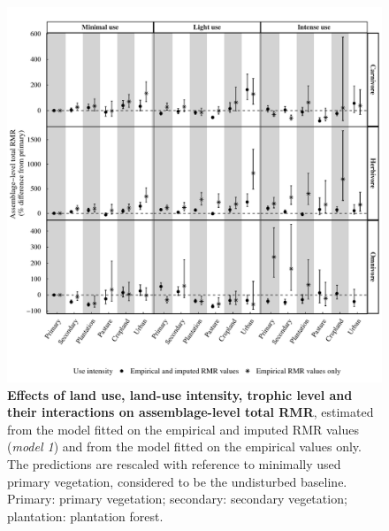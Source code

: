 \begin{figure}[h!]
\centering\includegraphics[scale=0.8]{Supporting/Chapter5/Figures/CompVSImp}
\caption[Effects of land use, land-use intensity, trophic level and their interactions on assemblage-level total RMR: empirical versus imputed]{\textbf{Effects of land use, land-use intensity, trophic level and their interactions on assemblage-level total RMR}, estimated from the model fitted on the empirical and imputed RMR values (\textit{model 1}) and from the model fitted on the empirical values only. The predictions are rescaled with reference to minimally used primary vegetation, considered to be the undisturbed baseline. Primary: primary vegetation; secondary: secondary vegetation; plantation: plantation forest.}
\label{SI5_figure5}
\end{figure}



